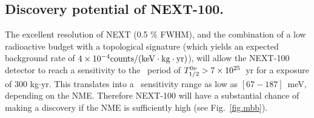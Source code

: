 \subsection{Discovery potential of NEXT-100.}

The excellent resolution of NEXT (0.5 \% FWHM), and the combination of a low radioactive budget with a topological signature (which yields an expected background rate of $4 \times 10^{-4} \rm counts/(keV \cdot kg \cdot yr)$), will allow the NEXT-100 detector to reach a sensitivity to the \bbonu\ period of $T_{1/2}^{0\nu} > 7 \times 10^{25}$~yr for a exposure of 300 kg$\cdot$yr. This translates into a \mbb\ sensitivity range as low as $[67-187]$~meV, depending on the NME. Therefore NEXT-100 will have a substantial chance of making a discovery if the NME is sufficiently high (see Fig.~\ref{fig.mbb}).
